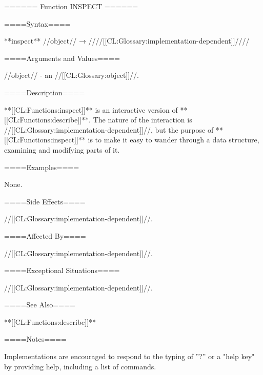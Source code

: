 ====== Function INSPECT ======

====Syntax====

**inspect** //object// → ////[[CL:Glossary:implementation-dependent]]////

====Arguments and Values====

//object// - an //[[CL:Glossary:object]]//.

====Description====

**[[CL:Functions:inspect]]** is an interactive version of **[[CL:Functions:describe]]**. The nature of the interaction is //[[CL:Glossary:implementation-dependent]]//, but the purpose of **[[CL:Functions:inspect]]** is to make it easy to wander through a data structure, examining and modifying parts of it.

====Examples====

None.

====Side Effects====

//[[CL:Glossary:implementation-dependent]]//.

====Affected By====

//[[CL:Glossary:implementation-dependent]]//.

====Exceptional Situations====

//[[CL:Glossary:implementation-dependent]]//.

====See Also====

**[[CL:Functions:describe]]**

====Notes====

Implementations are encouraged to respond to the typing of ''?'' or a "help key" by providing help, including a list of commands.

